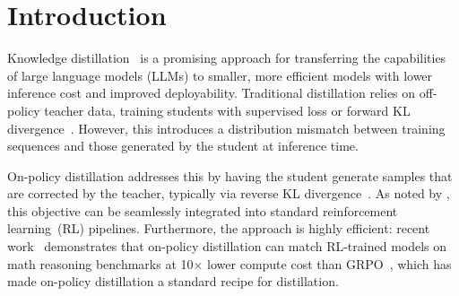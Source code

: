 \section{Introduction}

Knowledge distillation~\cite{hinton2015distilling} is a promising approach for transferring the capabilities of large language models (LLMs) to smaller, more efficient models with lower inference cost and improved deployability. Traditional distillation relies on off-policy teacher data, training students with supervised loss or forward KL divergence~\citep{kim2016sequence}. However, this introduces a distribution mismatch between training sequences and those generated by the student at inference time.

On-policy distillation addresses this by having the student generate samples that are corrected by the teacher, typically via reverse KL divergence~\citep{gu2024minillm, agarwal2024policy, lu2025onpolicydistillation}.
As noted by \citet{lu2025onpolicydistillation}, this objective can be seamlessly integrated into standard reinforcement learning~(RL) pipelines. Furthermore, the approach is highly efficient: recent work~\citep{lu2025onpolicydistillation, yang2025qwen3} demonstrates that on-policy distillation can match RL-trained models on math reasoning benchmarks at 10$\times$ lower compute cost than GRPO~\citep{shao2024deepseekmath}, which has made on-policy distillation a standard recipe for distillation. 



